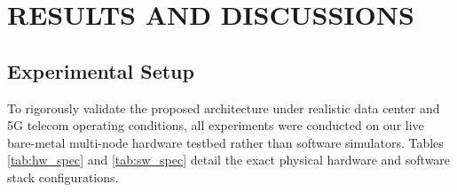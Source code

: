 \chapter{RESULTS AND DISCUSSIONS}

\section{Experimental Setup}
To rigorously validate the proposed architecture under realistic data center and 5G telecom operating conditions, all experiments were conducted on our live bare-metal multi-node hardware testbed rather than software simulators. Tables \ref{tab:hw_spec} and \ref{tab:sw_spec} detail the exact physical hardware and software stack configurations.

